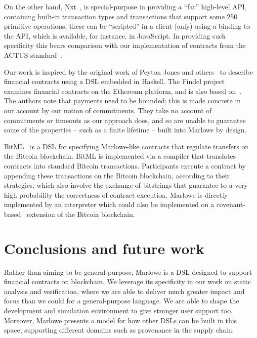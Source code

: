 \documentclass[runningheads]{llncs}
\begin{document}
On the other hand,  Nxt~\cite{Nxt}, is special-purpose in providing a ``fat'' high-level
API, containing built-in transaction types and transactions that support some 250 primitive operations; these can be ``scripted'' in a client (only) using a binding to the API, which is available, for instance, in JavaScript. In providing such specificity this bears comparison with our implementation of contracts from the ACTUS standard~\cite{actus}.

Our work is inspired by the original work of Peyton Jones and others~\cite{PeytonJones:2000} to describe financial contracts using a DSL embedded in Haskell. The Findel project~\cite{findel} examines financial contracts on the Ethereum platform, and is also based on~\cite{PeytonJones:2000}. The authors note that payments need to be bounded; this is made concrete in our
account by our notion of commitments. They take no account of commitments or timeouts as our approach does, and so are unable to guarantee some of the properties -- such as a finite lifetime -- built into Marlowe by design.

BitML~\cite{BitML} is a DSL for specifying Marlowe-like contracts that regulate transfers on the Bitcoin blockchain. BitML is implemented via a compiler that translates contracts into standard Bitcoin transactions. Participants execute a contract by appending these transactions on the Bitcoin blockchain, according to their strategies, which also involve the exchange of bitstrings that guarantee to a very high probability the correctness of contract execution. Marlowe is directly implemented by an interpreter which could also be implemented on a covenant-based~\cite{covenants} extension of the Bitcoin blockchain.

\section{Conclusions and future work}

Rather than aiming to be general-purpose, Marlowe is a DSL designed to support financial contracts on blockchain. We leverage its specificity in our work on static analysis and verification, where we are able to deliver much greater impact and focus than we could for a general-purpose language. We are able to shape the development and simulation environment to give stronger user support too. Moreover, Marlowe  presents a model for how other DSLs can be built in this space, supporting different domains such as provenance in the supply chain. 
\end{document}
